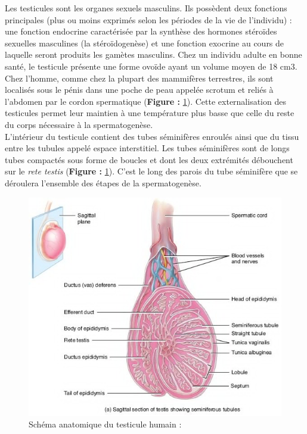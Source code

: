 \documentclass[12pt,twoside]{reedthesis}
\theoremstyle{definition}
\theoremstyle{definition}
\theoremstyle{remark}
\begin{document}
  Les testicules sont les organes sexuels masculins. Ils possèdent deux
  fonctions principales (plus ou moins exprimés selon les périodes de la
  vie de l'individu) : une fonction endocrine caractérisée par la synthèse
  des hormones stéroïdes sexuelles masculines (la stéroïdogenèse) et une
  fonction exocrine au cours de laquelle seront produits les gamètes
  masculins. Chez un individu adulte en bonne santé, le testicule présente
  une forme ovoïde ayant un volume moyen de 18 cm3. Chez l'homme, comme
  chez la plupart des mammifères terrestres, ils sont localisés sous le
  pénis dans une poche de peau appelée scrotum et reliés à l'abdomen par
  le cordon spermatique (\textbf{Figure :} \ref{fig:testicule}). Cette
  externalisation des testicules permet leur maintien à une température
  plus basse que celle du reste du corps nécessaire à la spermatogenèse.\\
  L'intérieur du testicule contient des tubes séminifères enroulés ainsi
  que du tissu entre les tubules appelé espace interstitiel. Les tubes
  séminifères sont de longs tubes compactés sous forme de boucles et dont
  les deux extrémités débouchent sur le \emph{rete testis} (\textbf{Figure
  :} \ref{fig:testicule}). C'est le long des parois du tube séminifère que
  se déroulera l'ensemble des étapes de la spermatogenèse.
  
  \begin{figure}
  
  {\centering \includegraphics[scale=0.65]{figure/coupe_testicule2} 
  
  }
  
  \caption{Schéma anatomique du testicule humain : }\label{fig:testicule}
  \end{figure}
  
\end{document}
